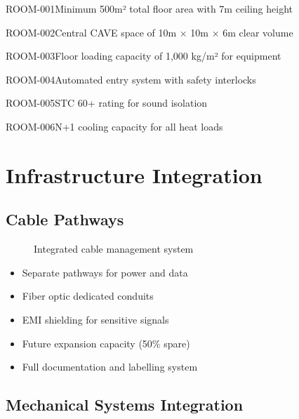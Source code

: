 \begin{requirement}{ROOM-001}{Minimum 500m² total floor area with 7m ceiling height}
\begin{requirement}{ROOM-002}{Central CAVE space of 10m × 10m × 6m clear volume}
\begin{requirement}{ROOM-003}{Floor loading capacity of 1,000 kg/m² for equipment}
\begin{requirement}{ROOM-004}{Automated entry system with safety interlocks}
\begin{requirement}{ROOM-005}{STC 60+ rating for sound isolation}
\begin{requirement}{ROOM-006}{N+1 cooling capacity for all heat loads}
\section{Infrastructure Integration}

\subsection{Cable Pathways}

\begin{figure}[H]
\centering
{}
\caption{Integrated cable management system}
\end{figure}

\begin{itemize}
    \item Separate pathways for power and data
    \item Fiber optic dedicated conduits
    \item EMI shielding for sensitive signals
    \item Future expansion capacity (50\% spare)
    \item Full documentation and labelling system
\end{itemize}

\subsection{Mechanical Systems Integration}


\end{requirement}
\end{requirement}
\end{requirement}
\end{requirement}
\end{requirement}
\end{requirement}
